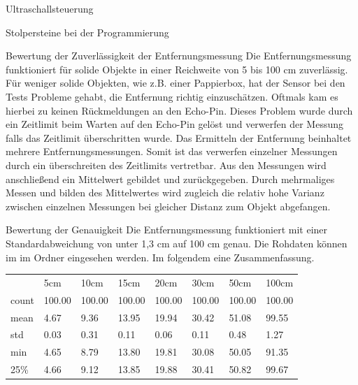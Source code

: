 \documentclass[12pt]{report}
\begin{document}
\begin{section}{Ultraschallsteuerung}
\begin{subsection}{Stolpersteine bei der Programmierung}
    \end{subsection}

    \begin{subsection}{Bewertung der Zuverlässigkeit der Entfernungsmessung}
      Die Entfernungsmessung funktioniert für solide Objekte in einer Reichweite
      von 5 bis 100 cm zuverlässig. Für weniger solide Objekten, wie z.B. einer
      Pappierbox, hat der Sensor bei den Tests Probleme
      gehabt, die Entfernung richtig einzuschätzen. Oftmals kam es hierbei zu keinen Rückmeldungen an den Echo-Pin. Dieses
      Problem wurde durch ein Zeitlimit beim Warten auf den Echo-Pin gelöst und
      verwerfen der Messung falls das Zeitlimit überschritten wurde. Das
      Ermitteln der Entfernung beinhaltet mehrere Entfernungsmessungen. Somit
      ist das verwerfen einzelner Messungen durch ein überschreiten des
      Zeitlimits vertretbar. Aus den Messungen wird anschließend ein Mittelwert
      gebildet und zurückgegeben. Durch mehrmaliges Messen und bilden des
      Mittelwertes wird zugleich die relativ hohe Varianz zwischen einzelnen
      Messungen bei gleicher Distanz zum Objekt abgefangen.
    \end{subsection}
    \begin{subsection}{Bewertung der Genauigkeit}
      Die Entfernungsmessung funktioniert mit einer Standardabweichung von unter
      1,3 cm auf 100 cm genau.
      Die Rohdaten können im \githubrepo{} im Ordner
       eingesehen werden.
      Im folgendem eine Zusammenfassung.
      \begin{table}[h!]
        \begin{tabularx}{\textwidth}{XXXXXXXX}
            {} &     5cm &    10cm &    15cm &    20cm &    30cm &    50cm &   100cm \\
            count &  100.00 &  100.00 &  100.00 &  100.00 &  100.00 &  100.00 &  100.00 \\
            mean  &    4.67 &    9.36 &   13.95 &   19.94 &   30.42 &   51.08 &   99.55 \\
            std   &    0.03 &    0.31 &    0.11 &    0.06 &    0.11 &    0.48 &    1.27 \\
            min   &    4.65 &    8.79 &   13.80 &   19.81 &   30.08 &   50.05 &   91.35 \\
            25\%   &    4.66 &    9.12 &   13.85 &   19.88 &   30.41 &   50.82 &   99.67 \\

\end{tabularx}
\end{table}
\end{subsection}
\end{section}
\end{document}
